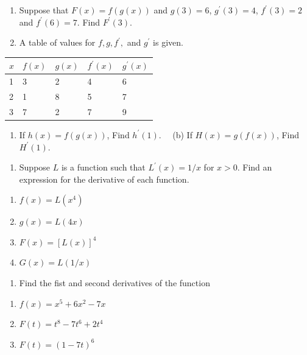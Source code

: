 \documentclass[]{book}
\providecommand{\tightlist}{%
  \setlength{\itemsep}{0pt}\setlength{\parskip}{0pt}}
\begin{document}
\begin{enumerate}
\def\labelenumi{\arabic{enumi}.}
\setcounter{enumi}{13}
\item
  Suppose that \(F(x) = f(g(x))\) and \(g(3) =6\), \(g^\prime(3) =4\), \(f^\prime(3) =2\) and \(f^\prime(6) =7\). Find \(F^\prime(3).\)
\item
  A table of values for \(f,g, f^\prime,\) and \(g^\prime\) is given.
\end{enumerate}

\begin{longtable}[]{@{}lllll@{}}
\toprule
\(x\) & \(f(x)\) & \(g(x)\) & \(f^\prime(x)\) & \(g^\prime(x)\)\tabularnewline
\midrule
\endhead
1 & 3 & 2 & 4 & 6\tabularnewline
2 & 1 & 8 & 5 & 7\tabularnewline
3 & 7 & 2 & 7 & 9\tabularnewline
\bottomrule
\end{longtable}

\begin{enumerate}
\def\labelenumi{(\alph{enumi})}
\tightlist
\item
  If \(h(x) = f(g(x))\), Find \(h^\prime (1)\). \(\text { }\) (b) If \(H(x) = g(f(x))\), Find \(H^\prime (1)\).
\end{enumerate}

\begin{enumerate}
\def\labelenumi{\arabic{enumi}.}
\setcounter{enumi}{15}
\tightlist
\item
  Suppose \(L\) is a function such that \(L^{\prime}(x)=1/x\) for \(x>0\). Find an expression for the derivative of each function.
\end{enumerate}

\begin{enumerate}
\def\labelenumi{(\alph{enumi})}
\tightlist
\item
  \(f(x)= L(x^4)\)
\item
  \(g(x)= L(4x)\)
\item
  \(F(x)= [L(x)]^4\)
\item
  \(G(x) = L(1/x)\)
\end{enumerate}

\begin{enumerate}
\def\labelenumi{\arabic{enumi}.}
\setcounter{enumi}{16}
\tightlist
\item
  Find the fist and second derivatives of the function
\end{enumerate}

\begin{enumerate}
\def\labelenumi{(\alph{enumi})}
\tightlist
\item
  \(f(x)= x^5+6x^2-7x\)
\item
  \(F(t)=t^8-7t^6+2t^4\)
\item
  \(F(t)= (1-7t)^6\)
\end{enumerate}
\end{document}
